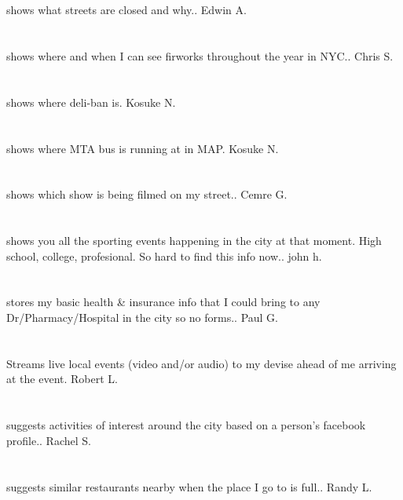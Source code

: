 \section{}shows what streets are closed and why.. Edwin A.
\section{}shows where and when I can see firworks throughout the year in NYC.. Chris S.
\section{}shows where deli-ban is. Kosuke N.
\section{}shows where MTA bus is running at in MAP. Kosuke N.
\section{}shows which show is being filmed on my street.. Cemre G.
\section{} shows you all the sporting events happening in the city at that moment.  High school,  college,  profesional. So hard to find this info now.. john h.
\section{} stores my basic health \& insurance info that I could bring to any Dr/Pharmacy/Hospital in the city so no forms.. Paul G.
\section{}Streams live local events (video and/or audio) to my devise ahead of me arriving at the event. Robert L.
\section{}suggests activities of interest around the city based on a person's facebook profile.. Rachel S.
\section{}suggests similar restaurants nearby when the place I go to is full.. Randy L.
